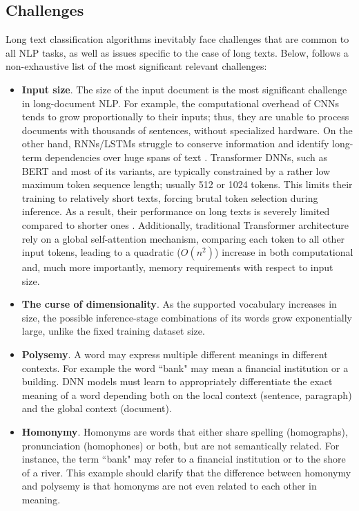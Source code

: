 \documentclass[preprint,review,12pt]{elsarticle}
\begin{document}
\subsection{Challenges}
\label{ssec::ClassificationChallenges}
Long text classification algorithms inevitably face challenges that are common to all NLP tasks, as well as issues specific to the case of long texts. Below, follows a non-exhaustive list of the most significant relevant challenges:

\begin{itemize}
\item \textbf{Input size}. The size of the input document is the most significant challenge in long-document NLP. For example, the computational overhead of CNNs tends to grow proportionally to their inputs; thus, they are unable to process documents with thousands of sentences, without specialized hardware. On the other hand, RNNs/LSTMs struggle to conserve information and identify long-term dependencies over huge spans of text \cite{worsham_book}. Transformer DNNs, such as BERT and most of its variants, are typically constrained by a rather low maximum token sequence length; usually 512 or 1024 tokens. This limits their training to relatively short texts, forcing brutal token selection during inference. As a result, their performance on long texts is severely limited compared to shorter ones \cite{dai}. Additionally, traditional Transformer architecture \cite{ilia} rely on a global self-attention mechanism, comparing each token to all other input tokens, leading to a quadratic ($O(n^2)$) increase in both computational and, much more importantly, memory requirements with respect to input size. 

\item \textbf{The curse of dimensionality}. As the supported vocabulary increases in size, the possible inference-stage combinations of its words grow exponentially large, unlike the fixed training dataset size.

\item \textbf{Polysemy}. A word may express multiple different meanings in different contexts. For example the word ``bank" may mean a financial institution or a building. DNN models must learn to appropriately differentiate the exact meaning of a word depending both on the local context (sentence, paragraph) and the global context (document).

\item \textbf{Homonymy}. Homonyms are words that either share spelling (homographs), pronunciation (homophones) or both, but are not semantically related. For instance, the term ``bank" may refer to a financial institution or to the shore of a river. This example should clarify that the difference between homonymy and polysemy is that homonyms are not even related to each other in meaning.


\end{itemize}
\end{document}
